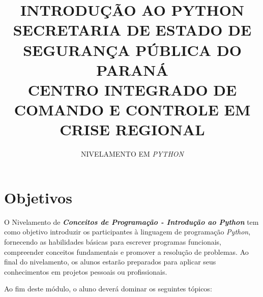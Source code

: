 \documentclass[a4paper, 12pt, onecolumn,singlespacing]{article}
\title{INTRODUÇÃO AO PYTHON\\SECRETARIA DE ESTADO DE SEGURANÇA PÚBLICA DO PARANÁ\\CENTRO INTEGRADO DE COMANDO E CONTROLE EM CRISE REGIONAL}
\author[1]{NIVELAMENTO EM \textit{PYTHON}}
\affil[1]{EQUIPE TÉCNICA CICCR}
\begin{document}
	
	\maketitle
	
	\section{Objetivos}
	
	O Nivelamento de \textbf{\textit{Conceitos de Programação - Introdução ao Python }}tem como objetivo introduzir os participantes à linguagem de programação \textit{Python}, fornecendo as habilidades básicas para escrever programas funcionais, compreender conceitos fundamentais e promover a resolução de problemas. Ao final do nivelamento, os alunos estarão preparados para aplicar seus conhecimentos em projetos pessoais ou profissionais.
	
	Ao fim deste módulo, o aluno deverá dominar os seguintes tópicos:
	
\end{document}
